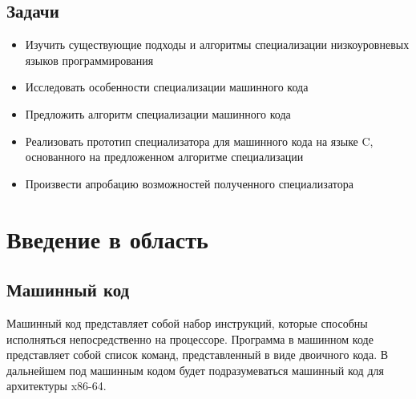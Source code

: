 \subsection*{Задачи}
\begin{itemize}
\item Изучить существующие подходы и алгоритмы специализации низкоуровневых языков программирования
\item Исследовать особенности специализации машинного кода
\item Предложить алгоритм специализации машинного кода
\item Реализовать прототип специализатора для машинного кода на языке C, основанного на предложенном алгоритме специализации
\item Произвести апробацию возможностей полученного специализатора
\end{itemize}

\section{ Введение в область}
\subsection{ Машинный код}
Машинный код\cite{AMD} представляет собой набор инструкций, которые способны исполняться непосредственно на процессоре. Программа в машинном коде представляет собой список команд, представленный в виде двоичного кода. В дальнейшем под машинным кодом будет подразумеваться машинный код для архитектуры x86-64.

